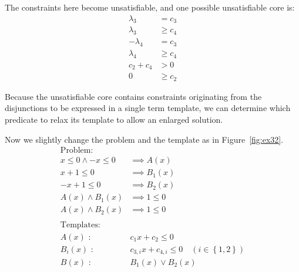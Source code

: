 The constraints here become unsatisfiable, and one possible
unsatisfiable core is:
\begin{align*}
\lambda_3 & = c_3 \\
\lambda_3 & \geq c_4 \\
- \lambda_4 & = c_3 \\
\lambda_4 & \geq c_4 \\
c_2 + c_4 & > 0 \\
0 & \geq c_2
\end{align*}

Because the unsatisfiable core contains constraints originating from
the disjunctions to be expressed in a single term template, we can
determine which predicate to relax its template to allow an enlarged solution.

Now we slightly change the problem and the template as in Figure~\ref{fig:ex32}.
\begin{align*}
\text{Problem:} \\
x \leq 0 \wedge -x \leq 0 & \implies A(x) \\
x+1 \leq 0 & \implies B_1(x) \\
-x+1 \leq 0 & \implies B_2(x) \\
A(x) \wedge B_1(x) & \implies 1 \leq 0 \\
A(x) \wedge B_2(x) & \implies 1 \leq 0 \\
\\
\text{Templates:} \\
A(x) \text{ : } & c_1 x + c_2 \leq 0 \\
B_i(x) \text{ : } & c_{3,i} x + c_{4,i} \leq 0 \quad (i \in \left\lbrace 1,2 \right\rbrace ) \\
B(x) \text{ : } & B_1(x) \vee B_2(x)
\end{align*}

